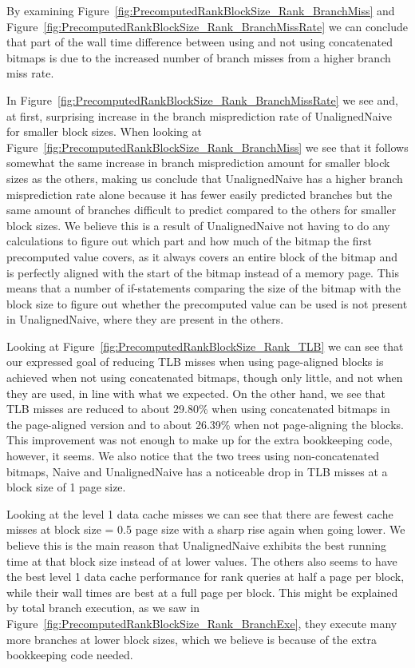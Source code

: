 By examining Figure~\ref{fig:PrecomputedRankBlockSize_Rank_BranchMiss} and Figure~\ref{fig:PrecomputedRankBlockSize_Rank_BranchMissRate} we can conclude that part of the wall time difference between using and not using concatenated bitmaps is due to the increased number of branch misses from a higher branch miss rate.

In Figure~\ref{fig:PrecomputedRankBlockSize_Rank_BranchMissRate} we see and, at first, surprising increase in the branch misprediction rate of UnalignedNaive for smaller block sizes.
When looking at Figure~\ref{fig:PrecomputedRankBlockSize_Rank_BranchMiss} we see that it follows somewhat the same increase in branch misprediction amount for smaller block sizes as the others, making us conclude that UnalignedNaive has a higher branch misprediction rate alone because it has fewer easily predicted branches but the same amount of branches difficult to predict compared to the others for smaller block sizes.
We believe this is a result of UnalignedNaive not having to do any calculations to figure out which part and how much of the bitmap the first precomputed value covers, as it always covers an entire block of the bitmap and is perfectly aligned with the start of the bitmap instead of a memory page.
This means that a number of if-statements comparing the size of the bitmap with the block size to figure out whether the precomputed value can be used is not present in UnalignedNaive, where they are present in the others.

Looking at Figure~\ref{fig:PrecomputedRankBlockSize_Rank_TLB} we can see that our expressed goal of reducing TLB misses when using page-aligned blocks is achieved when not using concatenated bitmaps, though only little, and not when they are used, in line with what we expected.
On the other hand, we see that TLB misses are reduced to about 29.80\% when using concatenated bitmaps in the page-aligned version and to about 26.39\% when not page-aligning the blocks.
This improvement was not enough to make up for the extra bookkeeping code, however, it seems.
We also notice that the two trees using non-concatenated bitmaps, Naive and UnalignedNaive has a noticeable drop in TLB misses at a block size of 1 page size.


Looking at the level 1 data cache misses we can see that there are fewest cache misses at block size = 0.5 page size with a sharp rise again when going lower.
We believe this is the main reason that UnalignedNaive exhibits the best running time at that block size instead of at lower values.
The others also seems to have the best level 1 data cache performance for rank queries at half a page per block, while their wall times are best at a full page per block.
This might be explained by total branch execution, as we saw in Figure~\ref{fig:PrecomputedRankBlockSize_Rank_BranchExe}, they execute many more branches at lower block sizes, which we believe is because of the extra bookkeeping code needed.

